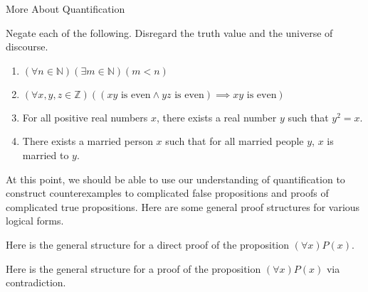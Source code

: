 \begin{section}{More About Quantification}
\begin{exercise}
Negate each of the following.  Disregard the truth value and the universe of discourse.
\begin{enumerate}[label=\textrm{(\alph*)}]
\item $(\forall n\in\mathbb{N})(\exists m\in\mathbb{N})(m<n)$
\item $(\forall x,y,z\in\mathbb{Z})((xy \mbox{ is even}\wedge yz\mbox{ is even})\implies xy\mbox{ is even})$
\item For all positive real numbers $x$, there exists a real number $y$ such that $y^2=x$.
\item There exists a married person $x$ such that for all married people $y$, $x$ is married to $y$.
\end{enumerate}
\end{exercise}

At this point, we should be able to use our understanding of quantification to construct counterexamples to complicated false propositions and proofs of complicated true propositions.  Here are some general proof structures for various logical forms.

\begin{skeleton}
Here is the general structure for a direct proof of the proposition $(\forall x)P(x)$.

\begin{center}
\end{center}
\end{skeleton}

\begin{skeleton}
Here is the general structure for a proof of the proposition $(\forall x)P(x)$ via contradiction.


\end{skeleton}
\end{section}
